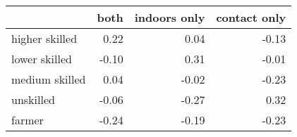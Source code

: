 
\begin{tabular}{l|r|r|r}
\hline
  & both & indoors only & contact only\\
\hline
higher skilled & 0.22 & 0.04 & -0.13\\
\hline
lower skilled & -0.10 & 0.31 & -0.01\\
\hline
medium skilled & 0.04 & -0.02 & -0.23\\
\hline
unskilled & -0.06 & -0.27 & 0.32\\
\hline
farmer & -0.24 & -0.19 & -0.23\\
\hline
\end{tabular}
